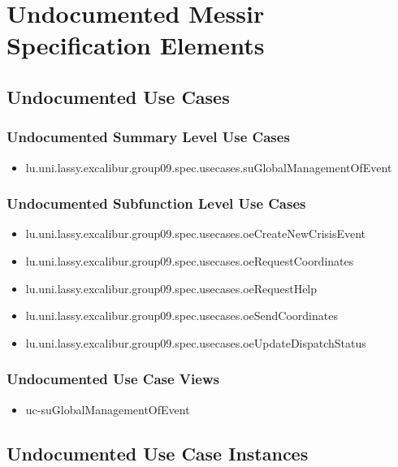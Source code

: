 	
\chapter{Undocumented Messir Specification Elements}


\section[Undocumented Use Cases]{Undocumented Use Cases}

\subsection[Undocumented Use Cases - Summary Level]{Undocumented Summary Level Use Cases}
\begin{itemize}
\item lu.uni.lassy.excalibur.group09.spec.usecases.suGlobalManagementOfEvent 
\end{itemize}


\subsection[Undocumented Use Cases - Subfunction Level]{Undocumented Subfunction Level Use Cases}
\begin{itemize}
\item lu.uni.lassy.excalibur.group09.spec.usecases.oeCreateNewCrisisEvent 
\item lu.uni.lassy.excalibur.group09.spec.usecases.oeRequestCoordinates 
\item lu.uni.lassy.excalibur.group09.spec.usecases.oeRequestHelp 
\item lu.uni.lassy.excalibur.group09.spec.usecases.oeSendCoordinates 
\item lu.uni.lassy.excalibur.group09.spec.usecases.oeUpdateDispatchStatus 
\end{itemize}

\subsection[Undocumented Use Case Views]{Undocumented Use Case Views}
\begin{itemize}
\item uc-suGlobalManagementOfEvent 
\end{itemize}




\section[Undocumented Use Case Instances]{Undocumented Use Case Instances}

